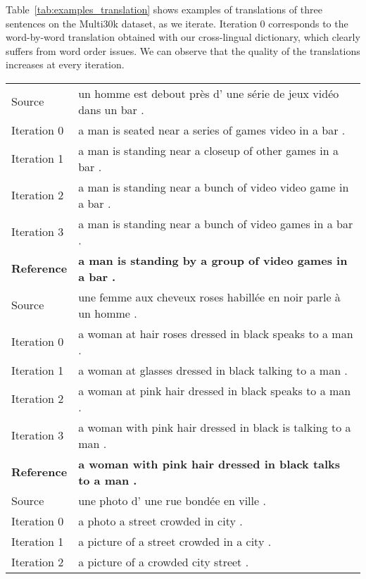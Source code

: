 \documentclass{article} \usepackage{iclr2018_conference,times}
\begin{document}
Table~\ref{tab:examples_translation} shows examples of translations of three sentences on the Multi30k dataset, as we iterate. Iteration 0 corresponds to the word-by-word translation obtained with our cross-lingual dictionary, which clearly suffers from word order issues. We can observe that the quality of the translations increases at every iteration.


\begin{table}[bt]
\small
\begin{center}
    \small
    \begin{tabular}{ll}
    \toprule
    Source & un homme est debout pr\`es d' une s\'erie de jeux vid\'eo dans un bar .       \\
    Iteration 0 & a man is seated near a series of games video in a bar .                  \\
    Iteration 1 & a man is standing near a closeup of other games in a bar .               \\
    Iteration 2 & a man is standing near a bunch of video video game in a bar .            \\
    Iteration 3 & a man is standing near a bunch of video games in a bar .                 \\
    \textbf{Reference}   & \textbf{a man is standing by a group of video games in a bar .} \\
    \midrule
    Source      & une femme aux cheveux roses habill\'ee en noir parle \`a un homme .        \\
    Iteration 0 & a woman at hair roses dressed in black speaks to a man .                   \\
    Iteration 1 & a woman at glasses dressed in black talking to a man .                     \\
    Iteration 2 & a woman at pink hair dressed in black speaks to a man .                    \\
    Iteration 3 & a woman with pink hair dressed in black is talking to a man .              \\
    \textbf{Reference}   & \textbf{a woman with pink hair dressed in black talks to a man .} \\
    \midrule
    Source             &  une photo d' une rue bond\'ee en ville .   \\
    Iteration 0        &  a photo a street crowded in city .         \\
    Iteration 1        &  a picture of a street crowded in a city .  \\
    Iteration 2        &  a picture of a crowded city street .       \\

\end{tabular}
\end{center}
\end{table}
\end{document}
